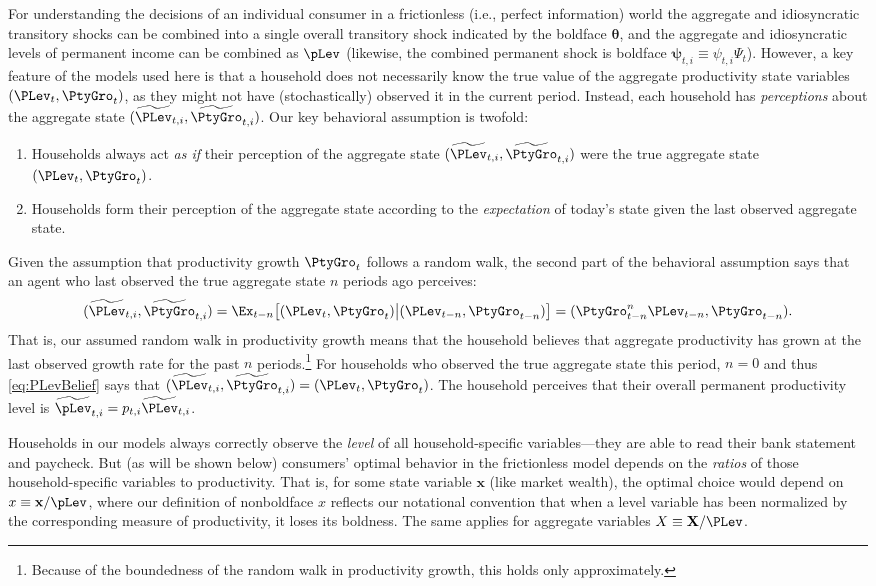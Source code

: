 \documentclass[titlepage]{\econtex}\newcommand{\texname}{cAndCwithStickyE}
\begin{document}
For understanding the decisions of an individual consumer in a frictionless (i.e., perfect information) world the aggregate and idiosyncratic transitory shocks can be combined into a single overall transitory shock indicated by the boldface $\pmb{\theta}$, and the aggregate and idiosyncratic levels of permanent income can be combined as $\pLev$ (likewise, the combined permanent shock is boldface $\pmb{\psi}_{t,i}\equiv \psi_{t,i} \Psi_{t}$).  However, a key feature of the models used here is that a household does not necessarily know the true value of the aggregate productivity state variables $(\PLev_t,\PtyGro_t)$, as they might not have (stochastically) observed it in the current period.  Instead, each household has \textit{perceptions} about the aggregate state $(\perc{\PLev}_{t,i},\perc{\PtyGro}_{t,i})$.  Our key behavioral assumption is twofold:
\begin{enumerate}
\item Households always act \textit{as if} their perception of the aggregate state $(\perc{\PLev}_{t,i},\perc{\PtyGro}_{t,i})$ were the true aggregate state $(\PLev_t,\PtyGro_t)$.

\item Households form their perception of the aggregate state according to the \textit{expectation} of today's state given the last observed aggregate state.
\end{enumerate}
Given the assumption that productivity growth $\PtyGro_t$ follows a random walk,
the second part of the behavioral assumption says that an agent who last observed the true
aggregate state $n$ periods ago perceives:
\begin{equation}\label{eq:PLevBelief}
(\perc{\PLev}_{t,i},\perc{\PtyGro}_{t,i}) = \Ex_{t-n}\big[(\PLev_t,\PtyGro_t) \big| (\PLev_{t-n},\PtyGro_{t-n})\big] = (\PtyGro_{t-n}^n \PLev_{t-n},\PtyGro_{t-n}).
\end{equation}
That is, our assumed random walk in productivity growth means that the household believes that aggregate productivity has grown at the last observed growth rate for the past $n$ periods.\footnote{Because of the boundedness of the random walk in productivity growth, this holds only approximately.}  For households who observed the true aggregate state this period, $n=0$ and thus \eqref{eq:PLevBelief} says that $(\perc{\PLev}_{t,i},\perc{\PtyGro}_{t,i}) = (\PLev_t,\PtyGro_t)$.  The household perceives that their overall permanent productivity level is $\perc{\pLev}_{t,i} = p_{t,i} \perc{\PLev}_{t,i}$.

Households in our models always correctly observe the \textit{level} of all household-specific variables---they are able to read their bank statement and paycheck. But (as will be shown below) consumers' optimal behavior in the frictionless model depends on the {\it ratios} of those household-specific variables to productivity.  That is, for some state variable $\textbf{x}$ (like market wealth), the optimal choice would depend on ${x} \equiv \mathbf{x}/{\pLev}$, where our definition of nonboldface ${x}$ reflects our notational convention that when a level variable has been normalized by the corresponding measure of productivity, it loses its boldness.  The same applies for aggregate variables ${X} \equiv \mathbf{X}/{\PLev}$.
\end{document}
